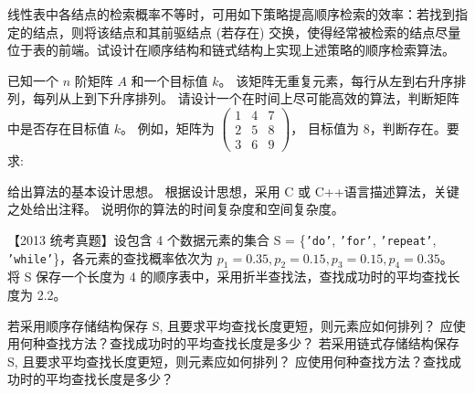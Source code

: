 \begin{qitems}
    \begin{bbox}
        \qitem 线性表中各结点的检索概率不等时，可用如下策略提高顺序检索的效率：若找到指定的结点，则将该结点和其前驱结点 (若存在) 交换，使得经常被检索的结点尽量位于表的前端。试设计在顺序结构和链式结构上实现上述策略的顺序检索算法。
    \end{bbox}

    \begin{bbox}
        \qitem 已知一个 $n$ 阶矩阵 $A$ 和一个目标值 $k$。
        该矩阵无重复元素，每行从左到右升序排列，每列从上到下升序排列。
        请设计一个在时间上尽可能高效的算法，判断矩阵中是否存在目标值 $k$。
        例如，矩阵为 $\begin{pmatrix} 1 & 4 & 7 \\ 2 & 5 & 8 \\ 3 & 6 & 9 \end{pmatrix}$，
        目标值为 8，判断存在。要求:
        \begin{subqitems}
            \subqitem 给出算法的基本设计思想。
            \subqitem 根据设计思想，采用 C 或 C++语言描述算法，关键之处给出注释。
            \subqitem 说明你的算法的时间复杂度和空间复杂度。
        \end{subqitems}
    \end{bbox}

    \begin{bbox}
        \qitem 【2013 统考真题】设包含 4 个数据元素的集合 S = \{\texttt{'do'}, \texttt{'for'}, \texttt{'repeat'}, 
        \texttt{'while'}\}，各元素的查找概率依次为 $p_1=0.35, p_2=0.15, p_3=0.15, p_4=0.35$。
        将 S 保存一个长度为 4 的顺序表中，采用折半查找法，查找成功时的平均查找长度为 2.2。
        \begin{subqitems}
            \subqitem 若采用顺序存储结构保存 S, 且要求平均查找长度更短，则元素应如何排列？
            应使用何种查找方法？查找成功时的平均查找长度是多少？
            \subqitem 若采用链式存储结构保存 S, 且要求平均查找长度更短，则元素应如何排列？
            应使用何种查找方法？查找成功时的平均查找长度是多少？
        \end{subqitems}
    \end{bbox}

\end{qitems} 